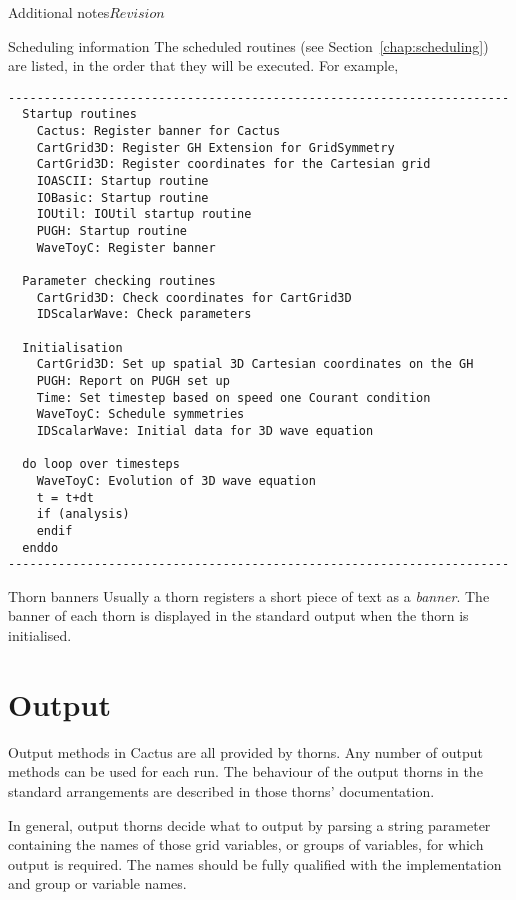 \begin{cactuspart}{Additional notes}{}{$Revision$}
\begin{Lentry}
\item [Scheduling information]
        The scheduled routines (see Section~\ref{chap:scheduling})
are listed, in the order that they will be executed. For example,

\begin{verbatim}
----------------------------------------------------------------------
  Startup routines
    Cactus: Register banner for Cactus
    CartGrid3D: Register GH Extension for GridSymmetry
    CartGrid3D: Register coordinates for the Cartesian grid
    IOASCII: Startup routine
    IOBasic: Startup routine
    IOUtil: IOUtil startup routine
    PUGH: Startup routine
    WaveToyC: Register banner

  Parameter checking routines
    CartGrid3D: Check coordinates for CartGrid3D
    IDScalarWave: Check parameters

  Initialisation
    CartGrid3D: Set up spatial 3D Cartesian coordinates on the GH
    PUGH: Report on PUGH set up
    Time: Set timestep based on speed one Courant condition
    WaveToyC: Schedule symmetries
    IDScalarWave: Initial data for 3D wave equation

  do loop over timesteps
    WaveToyC: Evolution of 3D wave equation
    t = t+dt
    if (analysis)
    endif
  enddo
----------------------------------------------------------------------
\end{verbatim}

\item [Thorn banners]
        Usually a thorn registers a short piece of text as a \emph{banner}.
        The banner of each thorn is displayed in the standard output when
        the thorn is initialised.

\end{Lentry}


\section{Output}
Output methods in Cactus are all provided by thorns.
Any number of output methods can be used for each run.
The behaviour of the output thorns in the
standard arrangements are described in those thorns' documentation.

In general, output thorns decide what to output by parsing a string parameter
containing the names of those grid variables, or groups of variables, for which
output is required. The names should be fully qualified with the
implementation and group or variable names.


\end{cactuspart}

